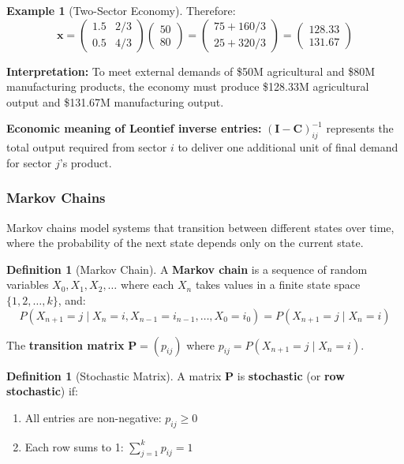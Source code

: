 \documentclass[12pt]{article}
\numberwithin{equation}{section}
\newcommand{\vect}[1]{\boldsymbol{#1}}   %
\newcommand{\mat}[1]{\mathbf{#1}}        %
\theoremstyle{plain}
\theoremstyle{definition}
\newtheorem{definition}[theorem]{Definition}
\newtheorem{example}[theorem]{Example}
\theoremstyle{remark}
\begin{document}
\begin{example}[Two-Sector Economy]
Therefore:
$$\vect{x} = \begin{pmatrix} 1.5 & 2/3 \\ 0.5 & 4/3 \end{pmatrix}\begin{pmatrix} 50 \\ 80 \end{pmatrix} = \begin{pmatrix} 75 + 160/3 \\ 25 + 320/3 \end{pmatrix} = \begin{pmatrix} 128.33 \\ 131.67 \end{pmatrix}$$

\textbf{Interpretation:} To meet external demands of \$50M agricultural and \$80M manufacturing products, the economy must produce \$128.33M agricultural output and \$131.67M manufacturing output.

\textbf{Economic meaning of Leontief inverse entries:} $(\mat{I} - \mat{C})^{-1}_{ij}$ represents the total output required from sector $i$ to deliver one additional unit of final demand for sector $j$'s product.
\end{example}

\subsubsection{Markov Chains}

Markov chains model systems that transition between different states over time, where the probability of the next state depends only on the current state.

\begin{definition}[Markov Chain]
A \textbf{Markov chain} is a sequence of random variables $X_0, X_1, X_2, \ldots$ where each $X_n$ takes values in a finite state space $\{1, 2, \ldots, k\}$, and:
$$P(X_{n+1} = j \mid X_n = i, X_{n-1} = i_{n-1}, \ldots, X_0 = i_0) = P(X_{n+1} = j \mid X_n = i)$$

The \textbf{transition matrix} $\mat{P} = (p_{ij})$ where $p_{ij} = P(X_{n+1} = j \mid X_n = i)$.
\end{definition}

\begin{definition}[Stochastic Matrix]
A matrix $\mat{P}$ is \textbf{stochastic} (or \textbf{row stochastic}) if:
\begin{enumerate}
\item All entries are non-negative: $p_{ij} \geq 0$
\item Each row sums to 1: $\sum_{j=1}^k p_{ij} = 1$
\end{enumerate}
\end{definition}
\end{document}
